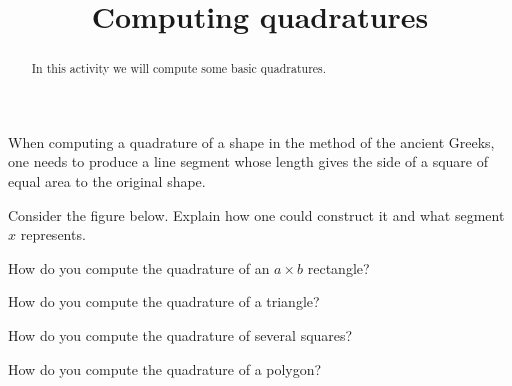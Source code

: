 \documentclass{ximera}
\title{Computing quadratures}
\begin{document}
\begin{abstract}
In this activity we will compute some basic quadratures.
\end{abstract}
\maketitle


When computing a quadrature of a shape in the method of the ancient
Greeks, one needs to produce a line segment whose length gives the
side of a square of equal area to the original shape.


\begin{question}
Consider the figure below. Explain how one could construct it and
what segment $x$ represents.
\begin{image}
\end{image}
\end{question}


\begin{question}
How do you compute the quadrature of an $a\times b$ rectangle?
\end{question}

\begin{question}
How do you compute the quadrature of a triangle?
\end{question}


\begin{question}
How do you compute the quadrature of several squares?
\end{question}


\begin{question}
How do you compute the quadrature of a polygon?
\end{question}
\end{document}
